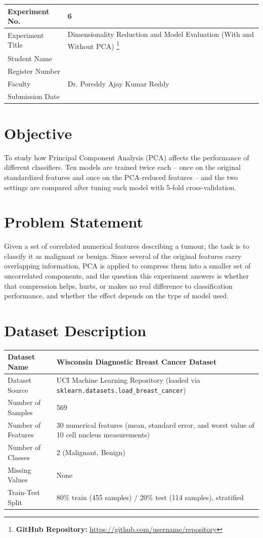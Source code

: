 \documentclass[12pt,a4paper]{article}
\begin{document}
\begin{tabular}{|p{4cm}|p{11cm}|}
\hline
Experiment No. & 6 \\ \hline
Experiment Title & Dimensionality Reduction and Model Evaluation (With and Without PCA)
\footnote{\textbf{GitHub Repository: }\url{https://github.com/username/repository}}\\ \hline
Student Name & \\ \hline
Register Number & \\ \hline
Faculty & Dr. Poreddy Ajay Kumar Reddy \\ \hline
Submission Date & \\ \hline
\end{tabular}

\section{Objective}
To study how Principal Component Analysis (PCA) affects the performance of different classifiers.
Ten models are trained twice each -- once on the original standardized features and once on the
PCA-reduced features -- and the two settings are compared after tuning each model with 5-fold
cross-validation.

\section{Problem Statement}
Given a set of correlated numerical features describing a tumour, the task is to classify it as
malignant or benign. Since several of the original features carry overlapping information, PCA is
applied to compress them into a smaller set of uncorrelated components, and the question this
experiment answers is whether that compression helps, hurts, or makes no real difference to
classification performance, and whether the effect depends on the type of model used.

\section{Dataset Description}
\begin{longtable}{|p{6cm}|p{8cm}|}
\hline
Dataset Name & Wisconsin Diagnostic Breast Cancer Dataset \\ \hline
Dataset Source & UCI Machine Learning Repository (loaded via \texttt{sklearn.datasets.load\_breast\_cancer}) \\ \hline
Number of Samples & 569 \\ \hline
Number of Features & 30 numerical features (mean, standard error, and worst value of 10 cell nucleus measurements) \\ \hline
Number of Classes & 2 (Malignant, Benign) \\ \hline
Missing Values & None \\ \hline
Train-Test Split & 80\% train (455 samples) / 20\% test (114 samples), stratified \\ \hline
\end{longtable}
\end{document}
